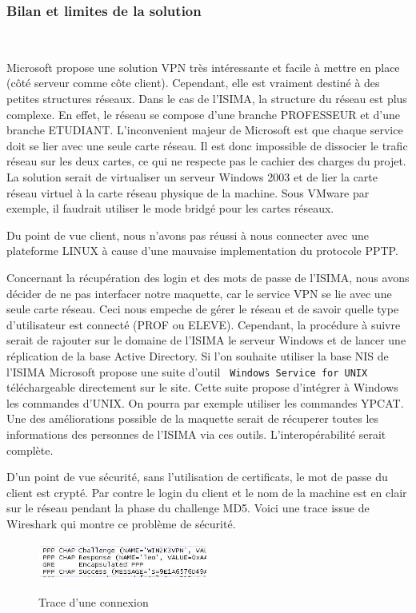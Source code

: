 \subsubsection{Bilan et limites de la solution}
~

Microsoft propose une solution VPN très intéressante et facile à mettre en place (côté serveur comme côte client). Cependant, elle est vraiment destiné à des petites structures réseaux. Dans le cas de l'ISIMA, la structure du réseau est plus complexe. En effet, le réseau se compose d'une branche PROFESSEUR et d'une branche ETUDIANT. L'inconvenient majeur de Microsoft est que chaque service doit se lier avec une seule carte réseau. Il est donc impossible de dissocier le trafic réseau sur les deux cartes, ce qui ne respecte pas le cachier des charges du projet. La solution serait de virtualiser un serveur Windows 2003 et de lier la carte réseau virtuel à la carte réseau physique de la machine. Sous VMware par exemple, il faudrait utiliser le mode bridgé pour les cartes réseaux.

Du point de vue client, nous n'avons pas réussi à nous connecter avec une plateforme LINUX à cause d'une mauvaise implementation du protocole PPTP.


Concernant la récupération des login et des mots de passe de l'ISIMA, nous avons décider de ne pas interfacer notre maquette, car le service VPN se lie avec une seule carte réseau. Ceci nous empeche de gérer le réseau et de savoir quelle type d'utilisateur est connecté (PROF ou ELEVE). Cependant, la procédure à suivre serait de rajouter sur le domaine de l'ISIMA le serveur Windows et de lancer une réplication de la base Active Directory. 
Si l'on souhaite utiliser la base NIS de l'ISIMA Microsoft propose une suite d'outil \verb| Windows Service for UNIX| téléchargeable directement sur le site. Cette suite propose d'intégrer à Windows les commandes d'UNIX. On pourra par exemple utiliser les commandes YPCAT. Une des améliorations possible de la maquette serait de récuperer toutes les informations des personnes de l'ISIMA via ces outils. L'interopérabilité serait complète.

D'un point de vue sécurité, sans l'utilisation de certificats, le mot de passe du client est crypté. Par contre le login du client et le nom de la machine est en clair sur le réseau pendant la phase du challenge MD5. 
Voici une trace issue de Wireshark qui montre ce problème de sécurité.

\begin{figure}[H]
	\begin{center}
		\includegraphics[width=0.5\textwidth]{partie_2/screen_windows/connexion.png}\\
	\end{center}
	\caption{Trace d'une connexion}
	\label{VPN_CONNEXION}
\end{figure}


